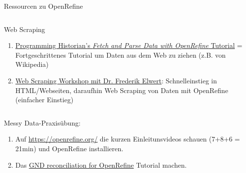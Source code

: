 \begin{frame}{Ressourcen zu OpenRefine}
\begin{columns}
\begin{alertblock}{Web Scraping}
  \begin{enumerate}\scriptsize
    \item \href{https://programminghistorian.org/en/lessons/fetch-and-parse-data-with-openrefine}{Programming Historian's \emph{Fetch and Parse Data with OpenRefine} Tutorial} = Fortgeschrittenes Tutorial um Daten aus dem Web zu ziehen (z.B. von Wikipedia)
    \item \href{https://www.youtube.com/watch?v=Wtbiv7yudtA}{Web Scraping Workshop mit Dr. Frederik Elwert}: Schnelleinstieg in HTML/Webseiten, daraufhin Web Scraping von Daten mit OpenRefine (einfacher Einstieg) 
  \end{enumerate}
\end{alertblock}

\end{columns}
    
\end{frame}


\begin{frame}[standout]
    \alert{Messy Data}-Praxisübung: \\
    \begin{enumerate}
        \item Auf \protect\url{https://openrefine.org/} die kurzen Einleitunsvideos schauen (7+8+6 = 21min) und OpenRefine installieren.
        \item Das \alert{\href{https://blog.lobid.org/2018/08/27/openrefine.html}{GND reconciliation for OpenRefine}} Tutorial machen.
    \end{enumerate} 
\end{frame}

%



